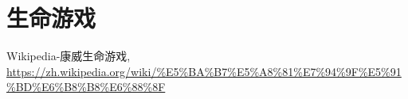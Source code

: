 \section{生命游戏}





\begin{thebibliography}{}
    Wikipedia-康威生命游戏, 
    \url{https://zh.wikipedia.org/wiki/%E5%BA%B7%E5%A8%81%E7%94%9F%E5%91%BD%E6%B8%B8%E6%88%8F}
\end{thebibliography}
